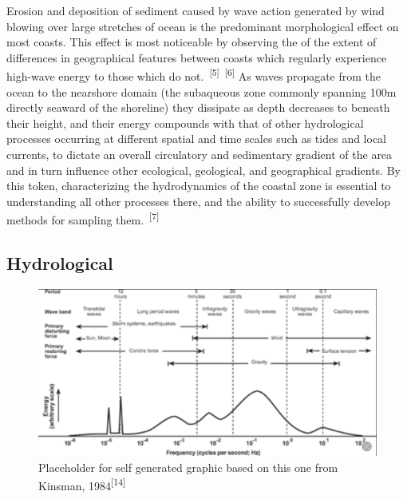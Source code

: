 \documentclass{article}
\begin{document}
{Erosion and deposition of sediment caused by wave action generated by wind blowing over large stretches of ocean is the predominant morphological effect on most coasts. This effect is most noticeable by observing the of the extent of differences in geographical features between coasts which regularly experience high-wave energy to those which do not.~\textsuperscript{[5]}~\textsuperscript{[6]} As waves propagate from the ocean to the nearshore domain (the subaqueous zone commonly spanning 100m directly seaward of the shoreline) they dissipate as depth decreases to beneath their height, and their energy compounds with that of other hydrological processes occurring at different spatial and time scales such as tides and local currents, to dictate an overall circulatory and sedimentary gradient of the area and in turn influence other ecological, geological, and geographical gradients. By this token, characterizing the hydrodynamics of the coastal zone is essential to understanding all other processes there, and the ability to successfully develop methods for sampling them.~\textsuperscript{[7]} \par}

\newpage
{}
\fancyfoot[C]{\thepage} 
\thispagestyle{fancy}
\subsection{Hydrological}

\begin{figure} 
    \centering
    \includegraphics[width=1\linewidth]{images/ocean-wave-energy-schematic.png}
    \caption{Placeholder for self generated graphic based on this one from Kinsman, 1984\textsuperscript{[14]}}
    \label{figure2}
\end{figure}
\end{document}
